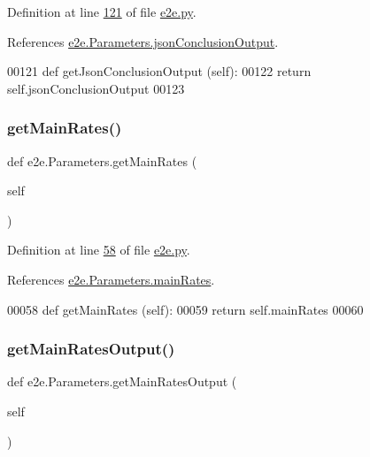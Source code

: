 Definition at line \hyperlink{e2e_8py_source_l00121}{121} of file \hyperlink{e2e_8py_source}{e2e.\+py}.



References \hyperlink{e2e_8py_source_l00040}{e2e.\+Parameters.\+json\+Conclusion\+Output}.


\begin{DoxyCode}
00121     \textcolor{keyword}{def }getJsonConclusionOutput (self):
00122         \textcolor{keywordflow}{return} self.jsonConclusionOutput
00123     
\end{DoxyCode}
\mbox{\label{classe2e_1_1_parameters_a067ce19caffb5ed5479219a911219c31}} 
\subsubsection{\texorpdfstring{get\+Main\+Rates()}{getMainRates()}}
{\footnotesize\ttfamily def e2e.\+Parameters.\+get\+Main\+Rates (\begin{DoxyParamCaption}\item[{}]{self }\end{DoxyParamCaption})}



Definition at line \hyperlink{e2e_8py_source_l00058}{58} of file \hyperlink{e2e_8py_source}{e2e.\+py}.



References \hyperlink{e2e_8py_source_l00029}{e2e.\+Parameters.\+main\+Rates}.


\begin{DoxyCode}
00058     \textcolor{keyword}{def }getMainRates (self):
00059         \textcolor{keywordflow}{return} self.mainRates
00060 
\end{DoxyCode}
\mbox{\label{classe2e_1_1_parameters_a7f42c96565591076b9ae5b06ce364bec}} 
\subsubsection{\texorpdfstring{get\+Main\+Rates\+Output()}{getMainRatesOutput()}}
{\footnotesize\ttfamily def e2e.\+Parameters.\+get\+Main\+Rates\+Output (\begin{DoxyParamCaption}\item[{}]{self }\end{DoxyParamCaption})}



